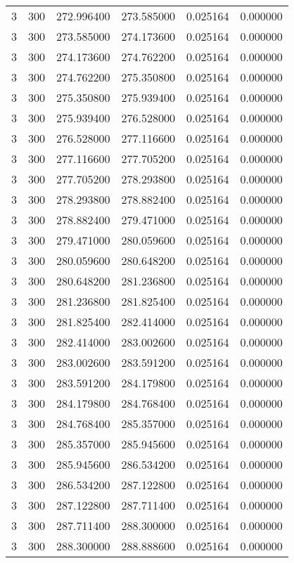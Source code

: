 \begin{longtable}{rrrrrr}
3 & 300 & 272.996400 & 273.585000 & 0.025164 & 0.000000 \\
3 & 300 & 273.585000 & 274.173600 & 0.025164 & 0.000000 \\
3 & 300 & 274.173600 & 274.762200 & 0.025164 & 0.000000 \\
3 & 300 & 274.762200 & 275.350800 & 0.025164 & 0.000000 \\
3 & 300 & 275.350800 & 275.939400 & 0.025164 & 0.000000 \\
3 & 300 & 275.939400 & 276.528000 & 0.025164 & 0.000000 \\
3 & 300 & 276.528000 & 277.116600 & 0.025164 & 0.000000 \\
3 & 300 & 277.116600 & 277.705200 & 0.025164 & 0.000000 \\
3 & 300 & 277.705200 & 278.293800 & 0.025164 & 0.000000 \\
3 & 300 & 278.293800 & 278.882400 & 0.025164 & 0.000000 \\
3 & 300 & 278.882400 & 279.471000 & 0.025164 & 0.000000 \\
3 & 300 & 279.471000 & 280.059600 & 0.025164 & 0.000000 \\
3 & 300 & 280.059600 & 280.648200 & 0.025164 & 0.000000 \\
3 & 300 & 280.648200 & 281.236800 & 0.025164 & 0.000000 \\
3 & 300 & 281.236800 & 281.825400 & 0.025164 & 0.000000 \\
3 & 300 & 281.825400 & 282.414000 & 0.025164 & 0.000000 \\
3 & 300 & 282.414000 & 283.002600 & 0.025164 & 0.000000 \\
3 & 300 & 283.002600 & 283.591200 & 0.025164 & 0.000000 \\
3 & 300 & 283.591200 & 284.179800 & 0.025164 & 0.000000 \\
3 & 300 & 284.179800 & 284.768400 & 0.025164 & 0.000000 \\
3 & 300 & 284.768400 & 285.357000 & 0.025164 & 0.000000 \\
3 & 300 & 285.357000 & 285.945600 & 0.025164 & 0.000000 \\
3 & 300 & 285.945600 & 286.534200 & 0.025164 & 0.000000 \\
3 & 300 & 286.534200 & 287.122800 & 0.025164 & 0.000000 \\
3 & 300 & 287.122800 & 287.711400 & 0.025164 & 0.000000 \\
3 & 300 & 287.711400 & 288.300000 & 0.025164 & 0.000000 \\
3 & 300 & 288.300000 & 288.888600 & 0.025164 & 0.000000 \\

\end{longtable}
